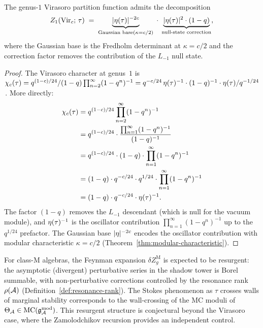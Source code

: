\begin{proposition}%
\label{prop:thqg-X-virasoro-decomposition}%
%
The genus-$1$ Virasoro partition function admits the decomposition
\begin{equation}\label{eq:thqg-X-virasoro-decomposition}
Z_1(\mathrm{Vir}_c;\,\tau)
\;=\;
\underbrace{|\eta(\tau)|^{-2c}}_{\text{Gaussian base}
(\kappa = c/2)}
\;\cdot\;
\underbrace{|\eta(\tau)|^{2}
\cdot (1-q)}_{\text{null-state correction}},
\end{equation}
where the Gaussian base is the Fredholm determinant at
$\kappa = c/2$ and the correction factor removes the
contribution of the $L_{-1}$ null state.
\end{proposition}

\begin{proof}
The Virasoro character at genus~$1$ is
$\chi_c(\tau) = q^{(1-c)/24}/(1-q)\prod_{n=2}^{\infty}(1-q^n)^{-1}
= q^{-c/24}\,\eta(\tau)^{-1}\cdot(1-q)^{-1}\cdot\eta(\tau)/q^{-1/24}$\,.
More directly:
\begin{align}
\chi_c(\tau)
&= q^{(1-c)/24} \prod_{n=2}^{\infty}(1-q^n)^{-1}
\notag\\
&= q^{(1-c)/24}
\cdot \frac{\prod_{n=1}^{\infty}(1-q^n)^{-1}}{(1-q)^{-1}}
\notag\\
&= q^{(1-c)/24}
\cdot (1-q) \cdot \prod_{n=1}^{\infty}(1-q^n)^{-1}
\notag\\
&= (1-q)\cdot q^{-c/24}\cdot q^{1/24}
\cdot \prod_{n=1}^{\infty}(1-q^n)^{-1}
\notag\\
&= (1-q)\cdot q^{-c/24}\cdot \eta(\tau)^{-1}.
\label{eq:thqg-X-virasoro-factorization}
\end{align}
The factor $(1-q)$ removes the $L_{-1}$ descendant (which is
null for the vacuum module), and $\eta(\tau)^{-1}$ is the
oscillator contribution $\prod_{n=1}^{\infty}(1-q^n)^{-1}$
up to the $q^{1/24}$ prefactor. The Gaussian base
$|\eta|^{-2c}$ encodes the oscillator contribution
with modular characteristic $\kappa = c/2$
(Theorem~\ref{thm:modular-characteristic}).
\end{proof}

\begin{remark}%
\label{rem:thqg-X-resurgent}%
%
For class-M algebras, the Feynman expansion
$\delta Z_g^{\mathrm{M}}$ is expected to be resurgent:
the asymptotic (divergent) perturbative series in the shadow
tower is Borel summable, with non-perturbative corrections
controlled by the resonance rank $\rho(\mathcal{A})$
(Definition~\ref{def:resonance-rank}). The Stokes phenomenon
as $\tau$ crosses walls of marginal stability corresponds to
the wall-crossing of the MC moduli of
$\Theta_{\mathcal{A}} \in \mathrm{MC}(\mathfrak{g}_{\mathcal{A}}^{\mathrm{mod}})$. This resurgent structure is
conjectural beyond the Virasoro case, where the Zamolodchikov
recursion provides an independent control.
\end{remark}

